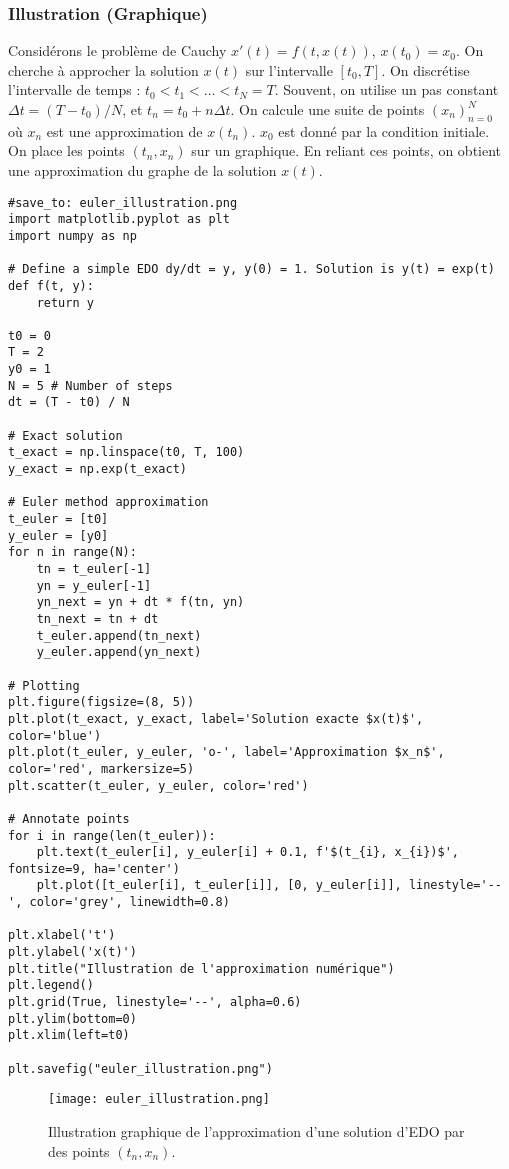 \documentclass{article}
\begin{document}
\subsubsection{Illustration (Graphique)} %
Considérons le problème de Cauchy $x'(t) = f(t, x(t))$, $x(t_0) = x_0$. On cherche à approcher la solution $x(t)$ sur l'intervalle $[t_0, T]$.
On discrétise l'intervalle de temps : $t_0 < t_1 < \dots < t_N = T$. Souvent, on utilise un pas constant $\Delta t = (T - t_0) / N$, et $t_n = t_0 + n \Delta t$.
On calcule une suite de points $(x_n)_{n=0}^N$ où $x_n$ est une approximation de $x(t_n)$. $x_0$ est donné par la condition initiale.
On place les points $(t_n, x_n)$ sur un graphique. En reliant ces points, on obtient une approximation du graphe de la solution $x(t)$.

\begin{verbatim}
#save_to: euler_illustration.png
import matplotlib.pyplot as plt
import numpy as np

# Define a simple EDO dy/dt = y, y(0) = 1. Solution is y(t) = exp(t)
def f(t, y):
    return y

t0 = 0
T = 2
y0 = 1
N = 5 # Number of steps
dt = (T - t0) / N

# Exact solution
t_exact = np.linspace(t0, T, 100)
y_exact = np.exp(t_exact)

# Euler method approximation
t_euler = [t0]
y_euler = [y0]
for n in range(N):
    tn = t_euler[-1]
    yn = y_euler[-1]
    yn_next = yn + dt * f(tn, yn)
    tn_next = tn + dt
    t_euler.append(tn_next)
    y_euler.append(yn_next)

# Plotting
plt.figure(figsize=(8, 5))
plt.plot(t_exact, y_exact, label='Solution exacte $x(t)$', color='blue')
plt.plot(t_euler, y_euler, 'o-', label='Approximation $x_n$', color='red', markersize=5)
plt.scatter(t_euler, y_euler, color='red')

# Annotate points
for i in range(len(t_euler)):
    plt.text(t_euler[i], y_euler[i] + 0.1, f'$(t_{i}, x_{i})$', fontsize=9, ha='center')
    plt.plot([t_euler[i], t_euler[i]], [0, y_euler[i]], linestyle='--', color='grey', linewidth=0.8)

plt.xlabel('t')
plt.ylabel('x(t)')
plt.title("Illustration de l'approximation numérique")
plt.legend()
plt.grid(True, linestyle='--', alpha=0.6)
plt.ylim(bottom=0)
plt.xlim(left=t0)

plt.savefig("euler_illustration.png")
\end{verbatim}

\begin{figure}[H]
\centering
\texttt{[image: euler\_illustration.png]}
\caption{Illustration graphique de l'approximation d'une solution d'EDO par des points $(t_n, x_n)$.}
\label{fig:euler_illustration}
\end{figure}
\end{document}
